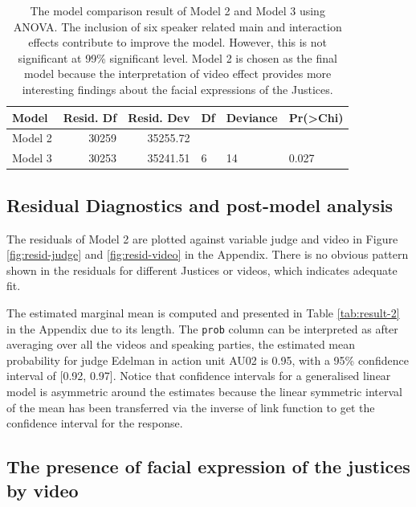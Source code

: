 \documentclass{monashthesis}
\begin{document}
\begin{table}[ht]
\begin{center}
\caption{\label{tab:anova-2}The model comparison result of Model 2 and Model 3 using ANOVA. The inclusion of six speaker related main and interaction effects contribute to improve the model. However, this is not significant at 99\% significant level. Model 2 is chosen as the final model because the interpretation of video effect provides more interesting findings about the facial expressions of the Justices. }
\begin{tabular}{lrrlll}
\toprule
Model & Resid. Df & Resid. Dev & Df & Deviance & Pr(>Chi) \\
\midrule
Model 2 & 30259 & 35255.72 &   &   &   \\
Model 3 & 30253 & 35241.51 & 6 & 14 & 0.027 \\
\bottomrule
\end{tabular}
\end{center}
\end{table}

\hypertarget{residual-diagnostics-and-post-model-analysis}{%
\subsection{Residual Diagnostics and post-model analysis}\label{residual-diagnostics-and-post-model-analysis}}

The residuals of Model 2 are plotted against variable judge and video in Figure \ref{fig:resid-judge} and \ref{fig:resid-video} in the Appendix. There is no obvious pattern shown in the residuals for different Justices or videos, which indicates adequate fit.

The estimated marginal mean is computed and presented in Table \ref{tab:result-2} in the Appendix due to its length. The \texttt{prob} column can be interpreted as after averaging over all the videos and speaking parties, the estimated mean probability for judge Edelman in action unit AU02 is 0.95, with a 95\% confidence interval of {[}0.92, 0.97{]}. Notice that confidence intervals for a generalised linear model is asymmetric around the estimates because the linear symmetric interval of the mean has been transferred via the inverse of link function to get the confidence interval for the response.

\hypertarget{the-presence-of-facial-expression-of-the-justices-by-video}{%
\subsection{The presence of facial expression of the justices by video}\label{the-presence-of-facial-expression-of-the-justices-by-video}}
\end{document}
